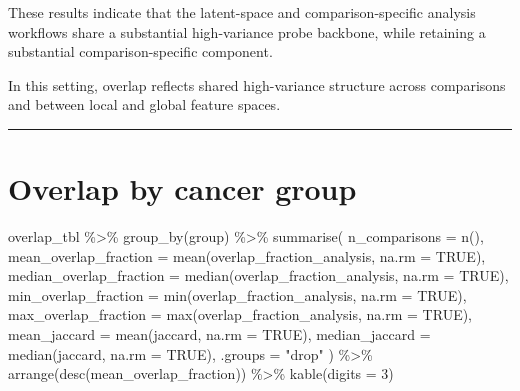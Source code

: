 \documentclass[
  letterpaper,
  DIV=11,
  numbers=noendperiod,
  openany,
  oneside]{scrreprt}
\newenvironment{Shaded}{\begin{snugshade}}{\end{snugshade}}
\newcommand{\AttributeTok}[1]{\textcolor[rgb]{0.40,0.45,0.13}{#1}}
\newcommand{\ConstantTok}[1]{\textcolor[rgb]{0.56,0.35,0.01}{#1}}
\newcommand{\DecValTok}[1]{\textcolor[rgb]{0.68,0.00,0.00}{#1}}
\newcommand{\FunctionTok}[1]{\textcolor[rgb]{0.28,0.35,0.67}{#1}}
\newcommand{\NormalTok}[1]{\textcolor[rgb]{0.00,0.23,0.31}{#1}}
\newcommand{\SpecialCharTok}[1]{\textcolor[rgb]{0.37,0.37,0.37}{#1}}
\newcommand{\StringTok}[1]{\textcolor[rgb]{0.13,0.47,0.30}{#1}}
\begin{document}
These results indicate that the latent-space and comparison-specific
analysis workflows share a substantial high-variance probe backbone,
while retaining a substantial comparison-specific component.

In this setting, overlap reflects shared high-variance structure across
comparisons and between local and global feature spaces.

\begin{center}\rule{0.5\linewidth}{0.5pt}\end{center}

\section{Overlap by cancer group}\label{overlap-by-cancer-group}

\begin{Shaded}
\begin{Highlighting}[]
\NormalTok{overlap\_tbl }\SpecialCharTok{\%\textgreater{}\%}
  \FunctionTok{group\_by}\NormalTok{(group) }\SpecialCharTok{\%\textgreater{}\%}
  \FunctionTok{summarise}\NormalTok{(}
    \AttributeTok{n\_comparisons =} \FunctionTok{n}\NormalTok{(),}
    \AttributeTok{mean\_overlap\_fraction =} \FunctionTok{mean}\NormalTok{(overlap\_fraction\_analysis, }\AttributeTok{na.rm =} \ConstantTok{TRUE}\NormalTok{),}
    \AttributeTok{median\_overlap\_fraction =} \FunctionTok{median}\NormalTok{(overlap\_fraction\_analysis, }\AttributeTok{na.rm =} \ConstantTok{TRUE}\NormalTok{),}
    \AttributeTok{min\_overlap\_fraction =} \FunctionTok{min}\NormalTok{(overlap\_fraction\_analysis, }\AttributeTok{na.rm =} \ConstantTok{TRUE}\NormalTok{),}
    \AttributeTok{max\_overlap\_fraction =} \FunctionTok{max}\NormalTok{(overlap\_fraction\_analysis, }\AttributeTok{na.rm =} \ConstantTok{TRUE}\NormalTok{),}
    \AttributeTok{mean\_jaccard =} \FunctionTok{mean}\NormalTok{(jaccard, }\AttributeTok{na.rm =} \ConstantTok{TRUE}\NormalTok{),}
    \AttributeTok{median\_jaccard =} \FunctionTok{median}\NormalTok{(jaccard, }\AttributeTok{na.rm =} \ConstantTok{TRUE}\NormalTok{),}
    \AttributeTok{.groups =} \StringTok{"drop"}
\NormalTok{  ) }\SpecialCharTok{\%\textgreater{}\%}
  \FunctionTok{arrange}\NormalTok{(}\FunctionTok{desc}\NormalTok{(mean\_overlap\_fraction)) }\SpecialCharTok{\%\textgreater{}\%}
  \FunctionTok{kable}\NormalTok{(}\AttributeTok{digits =} \DecValTok{3}\NormalTok{)}
\end{Highlighting}
\end{Shaded}
\end{document}
